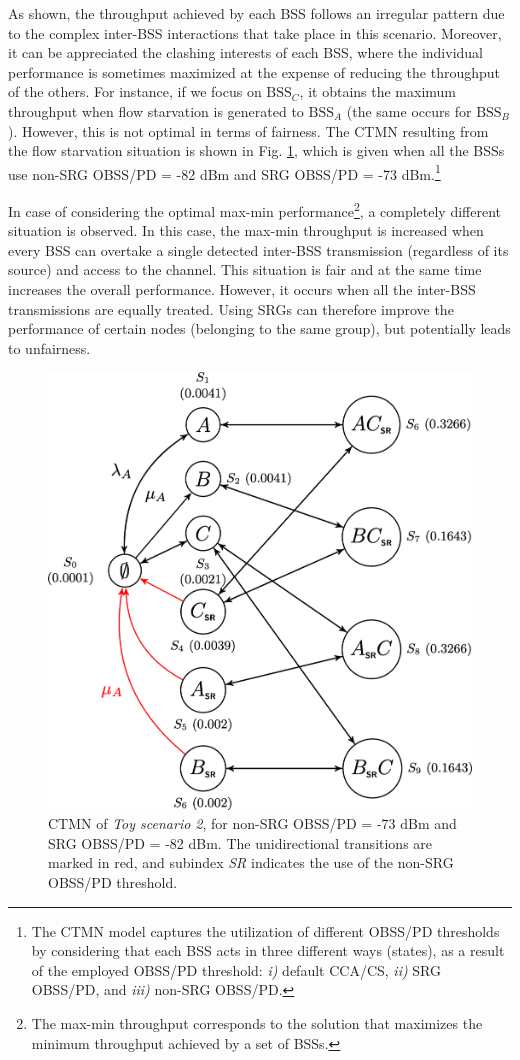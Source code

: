 \documentclass{article}
\begin{document}
As shown, the throughput achieved by each BSS follows an irregular pattern due to the complex inter-BSS interactions that take place in this scenario. Moreover, it can be appreciated the clashing interests of each BSS, where the individual performance is sometimes maximized at the expense of reducing the throughput of the others. For instance, if we focus on $\text{BSS}_C$, it obtains the maximum throughput when flow starvation is generated to $\text{BSS}_A$ (the same occurs for $\text{BSS}_B$). However, this is not optimal in terms of fairness. The CTMN resulting from the flow starvation situation is shown in Fig. \ref{fig:ctmn_scenario_2}, which is given when all the BSSs use non-SRG OBSS/PD = -82 dBm and SRG OBSS/PD = -73 dBm.\footnote{The CTMN model captures the utilization of different OBSS/PD thresholds by considering that each BSS acts in three different ways (states), as a result of the employed OBSS/PD threshold: \emph{i)} default CCA/CS, \emph{ii)} SRG OBSS/PD, and \emph{iii)} non-SRG OBSS/PD.}

In case of considering the optimal max-min performance\footnote{The max-min throughput corresponds to the solution that maximizes the minimum throughput achieved by a set of BSSs.}, a completely different situation is observed. In this case, the max-min throughput is increased when every BSS can overtake a single detected inter-BSS transmission (regardless of its source) and access to the channel. This situation is fair and at the same time increases the overall performance. However, it occurs when all the inter-BSS transmissions are equally treated. Using SRGs can therefore improve the performance of certain nodes (belonging to the same group), but potentially leads to unfairness. 
\begin{figure}[ht]
	\centering
	\includegraphics[width=.5\textwidth]{ctmn_scenario_2}
	\caption{CTMN of \emph{Toy scenario 2}, for non-SRG OBSS/PD = -73 dBm and SRG OBSS/PD = -82 dBm. The unidirectional transitions are marked in red, and subindex \emph{SR} indicates the use of the non-SRG OBSS/PD threshold.}
	\label{fig:ctmn_scenario_2}
\end{figure}
\end{document}
